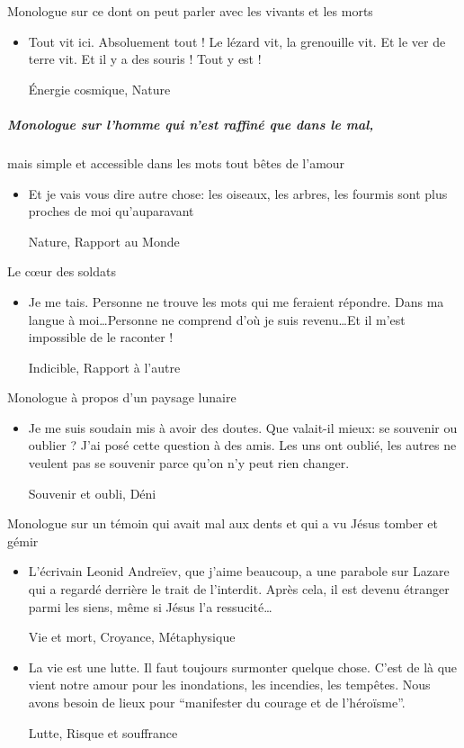 \documentclass[french,a4paper,11pt,answers]{exam}
\newcommand{\cit}[2]{\og #1 \fg{} \begin{solution}{ #2 }\end{solution}} %
\begin{document}
	\begin{cadre}{Monologue sur ce dont on peut parler avec les vivants et les morts}
		\begin{itemize}
			\item \cit {Tout vit ici. Absoluement tout ! Le lézard vit, la grenouille vit. Et le ver de terre vit. Et il y a des souris ! Tout y est !}
				{Énergie cosmique, Nature}
		\end{itemize}
	\end{cadre}
	
	\subparagraph{Monologue sur l'homme qui n'est raffiné que dans le mal{,}}
	\begin{cadre}{mais simple et accessible dans les mots tout bêtes de l'amour}
		\begin{itemize}
			\item \cit {Et je vais vous dire autre chose: les oiseaux, les arbres, les fourmis sont plus proches de moi qu'auparavant}
				{Nature, Rapport au Monde}
		\end{itemize}
	\end{cadre}
	
	\begin{cadre}{Le c\oe{}ur des soldats}
		\begin{itemize}
			\item \cit {Je me tais. Personne ne trouve les mots qui me feraient répondre. Dans ma langue à moi\ldots Personne ne comprend d'où je suis revenu\ldots Et il m'est impossible de le raconter !}
				{Indicible, Rapport à l'autre}
		\end{itemize}
	\end{cadre}

	\begin{cadre}{Monologue à propos d'un paysage lunaire}
		\begin{itemize}
			\item \cit {Je me suis soudain mis à avoir des doutes. Que valait-il mieux: se souvenir ou oublier ? J'ai posé cette question à des amis. Les uns ont oublié, les autres ne veulent pas se souvenir parce qu'on n'y peut rien changer.}
				{Souvenir et oubli, Déni}
		\end{itemize}
	\end{cadre}
	
	\begin{cadre}{Monologue sur un témoin qui avait mal aux dents et qui a vu Jésus tomber et gémir}
		\begin{itemize}
			\item \cit {L'écrivain Leonid Andreïev, que j'aime beaucoup, a une parabole sur Lazare qui a regardé derrière le trait de l'interdit. Après cela, il est devenu étranger parmi les siens, même si Jésus l'a ressucité\ldots}
				{Vie et mort, Croyance, Métaphysique}
			\item \cit{La vie est une lutte. Il faut toujours surmonter quelque chose. C'est de là que vient notre amour pour les inondations, les incendies, les tempêtes. Nous avons besoin de lieux pour “manifester du courage et de l'héroïsme''.}
				{Lutte, Risque et souffrance}
		\end{itemize}
	\end{cadre}
		
\end{document}
